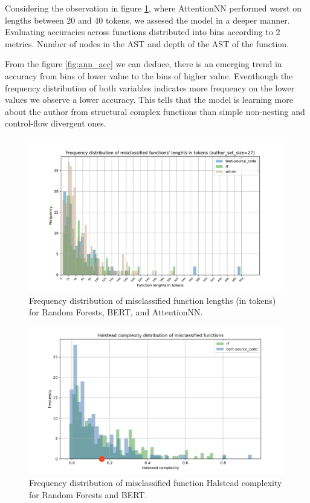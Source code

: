 \documentclass[conference]{IEEEtran}
\begin{document}
Considering the observation in figure \ref{fig:misclass_lens}, where AttentionNN performed worst on lengths between 20 and 40 tokens,
we assesed the model in a deeper manner. Evaluating accuracies across functions distributed into bins according to 2 metrics. 
Number of nodes in the AST and depth of the AST of the function. 

From the figure \ref{fig:ann_acc} we can deduce, there is an emerging trend in accuracy from bins of lower value to the bins of higher value.
Eventhough the frequency distribution of both variables indicates more frequency on the lower values we observe a lower
accuracy. This tells that the model is learning more about the author from structural complex functions than simple non-nesting and 
control-flow divergent ones.


\begin{figure}[!t]
    \centering
    \hspace*{-25pt}\includegraphics[width=1.2\columnwidth]{figures/misclass_lens.pdf}
    \caption{Frequency distribution of misclassified function lengths (in tokens) for Random Forests, BERT, and AttentionNN.}
    \label{fig:misclass_lens}
\end{figure}




\begin{figure}[!t]
    \centering
    \hspace*{-25pt}\includegraphics[width=1.2\columnwidth]{figures/misclass_hs.png}
    \caption{Frequency distribution of misclassified function Halstead complexity for Random Forests and BERT.}
    \label{fig:misclass_halstead}
\end{figure}
\end{document}
